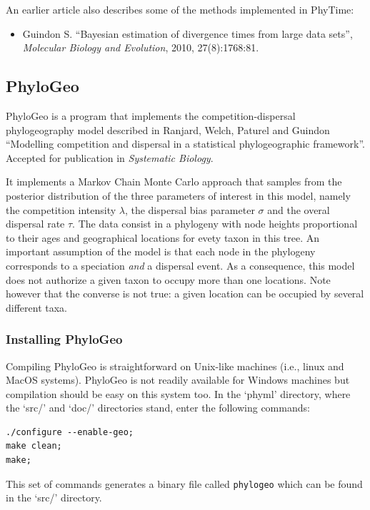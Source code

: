 \documentclass[a4paper,12pt]{article}
\newcommand{\x}[1]{\texttt{#1}}
\begin{document}
An earlier article also describes some of the methods implemented in PhyTime:

\begin{itemize}
\item Guindon  S. ``Bayesian estimation of divergence  times from large data  sets'', {\it Molecular
    Biology and Evolution}, 2010,
27(8):1768:81.
\end{itemize}



\subsection{PhyloGeo} PhyloGeo is  a program that implements the
competition-dispersal phylogeography model described in Ranjard, Welch, Paturel and Guindon
``Modelling competition  and  dispersal in a statistical phylogeographic framework''. Accepted for
publication in {\it Systematic Biology}.

It implements a  Markov Chain Monte Carlo  approach that samples from the  posterior distribution of
the three  parameters of  interest in this  model, namely  the competition intensity  $\lambda$, the
dispersal  bias parameter  $\sigma$ and  the overal  dispersal rate  $\tau$. The  data consist  in a
phylogeny with node heights proportional to their ages and geographical locations for evety taxon in
this tree. An important assumption of the model is that each node in the phylogeny corresponds to a
speciation {\em and} a dispersal event. As a consequence, this model does not authorize a given taxon to
occupy more than one locations. Note however that the converse is not true: a given location can be
occupied by several different taxa.

\subsubsection{Installing PhyloGeo}

Compiling PhyloGeo is straightforward on Unix-like  machines (i.e., linux and MacOS systems). PhyloGeo
is not readily available for Windows machines but  compilation should be easy on this system too. In
the `phyml' directory, where the `src/'  and `doc/' directories stand, enter the following commands:
{\setlength{\baselineskip}{0.5\baselineskip}
\begin{verbatim}
./configure --enable-geo;
make clean;
make;
\end{verbatim} } This set of commands generates  a binary file called \x{phylogeo} which can be found
  in the `src/' directory.
\end{document}
